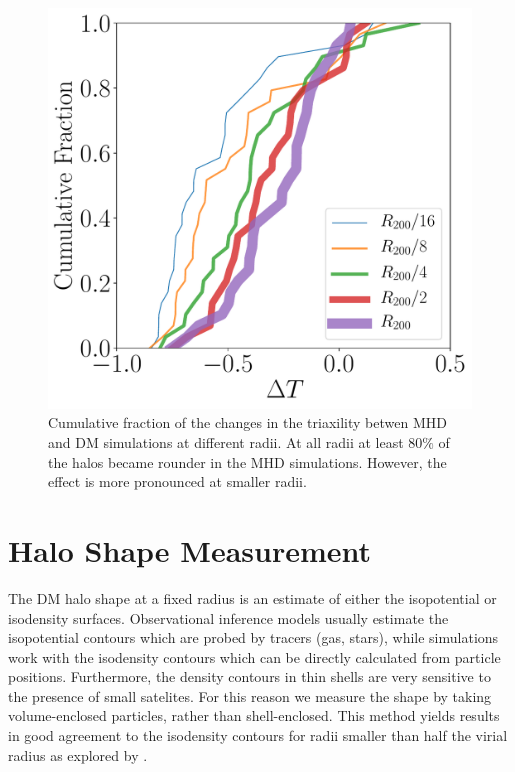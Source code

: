 \documentclass[a4paper,fleqn,usenatbib]{mnras}
\begin{document}
\begin{figure}
\includegraphics[width=0.9\columnwidth]{delta_triaxiality_distro.pdf}
\caption{Cumulative fraction of the changes in the triaxility betwen
  MHD and DM simulations at different radii. 
  At all radii at least $80\%$ of the halos became rounder in the MHD
  simulations. 
  However, the effect is more pronounced at smaller radii.}
\label{fig:delta_triaxial_cumulative}
\end{figure}

\section{Halo Shape Measurement}


The DM halo shape at a fixed radius is an estimate of either
the isopotential or isodensity surfaces.  
Observational inference models usually estimate the 
isopotential contours which are probed by tracers (gas, stars), while
simulations work with the isodensity contours which can be directly
calculated from particle positions.  
Furthermore, the density contours in thin shells are very sensitive to
the presence of small satelites.  
For this reason we measure the shape by taking
volume-enclosed particles, rather than shell-enclosed.  
This method yields results in good agreement to the isodensity
contours for radii smaller than half the virial radius as explored by
\citep{Vera-Ciro_et_al._2011}.
\end{document}
